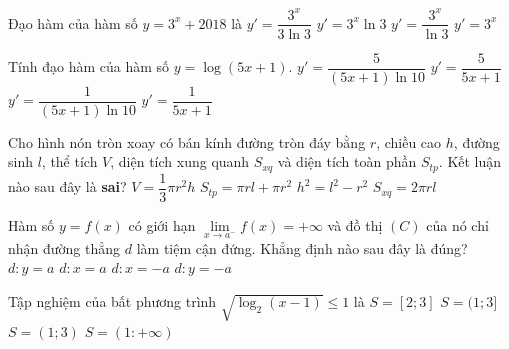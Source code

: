 \begin{ex}%
	Đạo hàm của hàm số $y=3^x+2018$ là
	\choice
	{$y'=\dfrac{3^x}{3\ln 3}$}
	{\True $y'=3^x\ln 3$}
	{$y'=\dfrac{3^x}{\ln 3}$}
	{$y'=3^x$}
\end{ex}

\begin{ex}%
	Tính đạo hàm của hàm số $y=\log\left(5x+1\right)$.
	\choice
	{\True $y'=\dfrac{5}{(5x+1)\ln 10}$}
	{$y'=\dfrac{5}{5x+1}$}
	{$y'=\dfrac{1}{(5x+1)\ln 10}$}
	{$y'=\dfrac{1}{5x+1}$}
\end{ex}


\begin{ex}%
	Cho hình nón tròn xoay có bán kính đường tròn đáy bằng $r$, chiều cao $h$, đường sinh $l$, thể tích $V$, diện tích xung quanh $S_{xq}$ và diện tích toàn phần $S_{tp}$. Kết luận nào sau đây là \textbf{sai}?
	\choice
	{$V=\dfrac{1}{3}\pi r^2h$}
	{$S_{tp}=\pi rl+\pi r^2$}
	{$h^2=l^2-r^2$}
	{\True $S_{xq}=2\pi rl$}
\end{ex}


\begin{ex}%
	Hàm số $y=f(x)$ có giới hạn $\lim\limits_{x\to a^-}f(x)=+\infty$ và đồ thị $(C)$ của nó chỉ nhận đường thẳng $d$ làm tiệm cận đứng. Khẳng định nào sau đây là đúng?
	\choice
	{$d: y=a$}
	{\True $d: x=a$}
	{$d: x=-a$}
	{$d: y=-a$}
\end{ex}


\begin{ex}%
	Tập nghiệm của bất phương trình $\sqrt{\log_2(x-1)}\leq 1$ là
	\choice
	{\True $S=\left[2; 3\right]$}
	{$S=(1; 3]$}
	{$S=(1; 3)$}
	{$S=(1: +\infty)$}
\end{ex}


